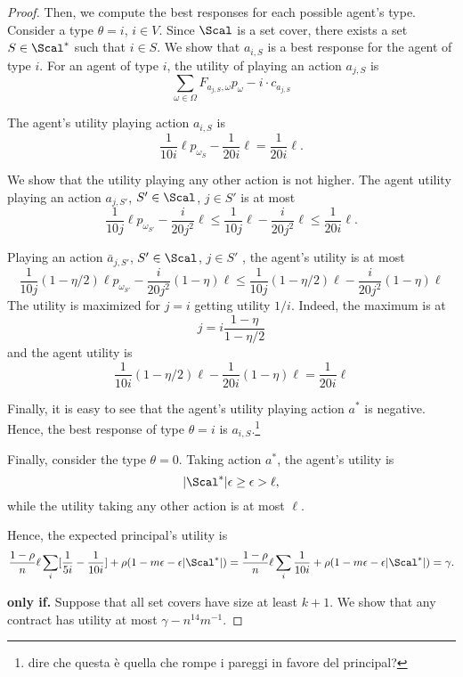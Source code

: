 \begin{proof}
	Then, we compute the best responses for each possible agent's type.
	Consider a type $\theta=i$, $i \in V$.
	Since $\Scal$ is a set cover, there exists a set $S \in \Scal^*$ such that $i \in S$.
	We show that $a_{i,S}$ is a best response for the agent of type $i$.
	For an agent of type $i$, the utility of playing an action $a_{j, S}$ is
	\[
	 \sum_{\omega \in \Omega} F_{ a_{j, S}, \omega } p_\omega - i \cdot c_{a_{j, S}} 
	 \]
	
	
	The agent's utility playing action $a_{i,S}$ is 
	\[ \frac{1}{10i}\ell p_{\omega_{S}} - \frac{1}{20i}\ell=\frac{1}{20i}\ell. \]
	
	We show that the utility playing any other action is not higher.
	The agent utility playing an action $a_{j,S'}$, $S'\in \Scal$, $j \in S'$  is at most 
	\[ \frac{1}{10j}\ell p_{\omega_{S'}} -\frac{i}{20j^2}\ell\le \frac{1}{10j}\ell -\frac{i}{20j^2}\ell\le\frac{1}{20i}\ell. \]
	
	Playing an action ${\bar a_{j,S'}}$, $S'\in \Scal$, $j \in S'$ , the agent's utility is at most
	\[ \frac{1}{10j} (1-\eta/2)\ell p_{\omega_{S'}}-\frac{i}{20j^2} (1-\eta) \ell\le  \frac{1}{10j} (1-\eta/2)\ell -\frac{i}{20j^2} (1-\eta) \ell \]
	The utility is maximized for $j=i$ getting utility $1/i$.
	Indeed, the maximum is at
	\[ j= i \frac{1-\eta}{1-\eta/2}  \]
	and the agent utility is 
	\[\frac{1}{10i} (1-\eta/2)\ell-\frac{1}{20i} (1-\eta) \ell=\frac{1}{20i}\ell \]	
	
	Finally, it is easy to see that the agent's utility playing action $a^*$ is negative.
	Hence, the best response of type $\theta=i$ is $a_{i,S}$.\footnote{dire che questa è quella che rompe i pareggi in favore del principal?}
	
	Finally, consider the type $\theta=0$.
	Taking action $a^*$, the agent's utility is
	\[|\Scal^*|\epsilon\ge \epsilon > \ell, \]
	while the utility taking any other action is at most $\ell$.
	
	Hence, the expected principal's utility is
	\[  \frac{1-\rho}{n} \ell \sum_{i} [\frac{1}{5i}- \frac{1}{10i}] + \rho (1-m\epsilon - \epsilon |\Scal^*|)= \frac{1-\rho}{n} \ell \sum_{i} \frac{1}{10i} + \rho (1-m\epsilon - \epsilon |\Scal^*|) =\gamma . \]
	
	\textbf{only if.}
	Suppose that all set covers have size at least $k+1$.
	We show that any contract has utility at most $\gamma-n^{14}m^{-1}$.
	

\end{proof}
